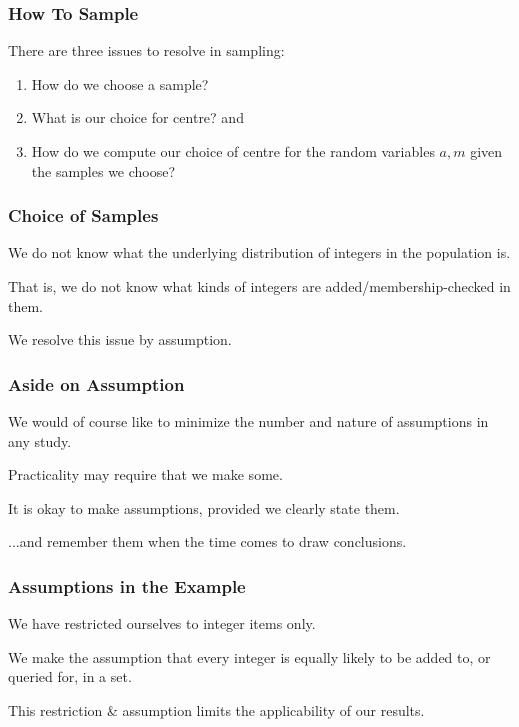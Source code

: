 \begin{frame}
\frametitle{How To Sample}
\begin{changemargin}{1cm}

There are three issues to resolve in sampling:

\begin{enumerate}
	\item How do we choose a sample? 
	\item What is our choice for centre? and 
	\item How do we compute our choice of centre for the random variables $a,m$ given the
samples we choose?
\end{enumerate}

\end{changemargin}
\end{frame}

\begin{frame}
\frametitle{Choice of Samples}
\begin{changemargin}{1cm}

We do not know what the underlying distribution of integers in the population is.

That is, we do not know what kinds of integers are added/membership-checked
in them. 

We resolve this issue by assumption.

\end{changemargin}
\end{frame}

\begin{frame}
\frametitle{Aside on Assumption}
\begin{changemargin}{1cm}

We would of course like to minimize the number and nature of
assumptions in any study. 

Practicality may require that
we make some. 

It is okay to make assumptions, provided
we clearly state them. 

...and remember them when the time comes to draw conclusions.

\end{changemargin}
\end{frame}

\begin{frame}
\frametitle{Assumptions in the Example}
\begin{changemargin}{1cm}

We have restricted ourselves to integer items only.

We make the assumption that every integer is
equally likely to be added to, or queried for, in a set.

This restriction \& assumption limits the applicability
of our results. 

\end{changemargin}
\end{frame}

